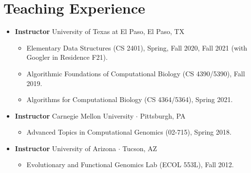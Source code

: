 \documentclass[10pt,letterpaper]{article}
\newcommand{\bigdot}{$\cdot$\xspace}
\begin{document}
\section*{Teaching Experience}
\begin{itemize}[leftmargin=*,labelindent=5pt,itemindent=-15pt]
\item \textbf{Instructor}  University of Texas at El Paso, El Paso, TX
\begin{itemize}
	\item Elementary Data Structures (CS 2401), Spring, Fall 2020, Fall 2021 (with Googler in Residence F21).
	\item Algorithmic Foundations of Computational Biology (CS 4390/5390), Fall 2019.
	\item Algorithms for Computational Biology (CS 4364/5364), Spring 2021.
\end{itemize}

\item \textbf{Instructor}  Carnegie Mellon University \bigdot Pittsburgh, PA
\begin{itemize}
    \item Advanced Topics in Computational Genomics (02-715), Spring 2018.
\end{itemize}

\item \textbf{Instructor} University of Arizona \bigdot Tucson, AZ
\begin{itemize}
    \item Evolutionary and Functional Genomics Lab (ECOL 553L), Fall 2012.
\end{itemize}

%
\end{itemize}
\end{document}
